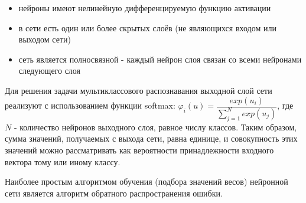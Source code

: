 \begin{itemize}
\item нейроны имеют нелинейную дифференцируемую функцию активации
\item в сети есть один или более скрытых слоёв (не являющихся входом или выходом сети)
\item сеть является полносвязной - каждый нейрон слоя связан со всеми нейронами следующего слоя
\end{itemize}

Для решения задачи мультиклассового распознавания выходной слой сети реализуют с использованием функции softmax: $\varphi_i(u)=\dfrac{exp(u_i)}{\sum_{j=1}^N exp(u_j)}$, где $N$ - количество нейронов выходного слоя, равное числу классов. Таким образом, сумма значений, получаемых с выхода сети, равна единице, и совокупность этих значений можно рассматривать как вероятности принадлежности входного вектора тому или иному классу.

Наиболее простым алгоритмом обучения (подбора значений весов) нейронной сети является алгоритм обратного распространения ошибки.



